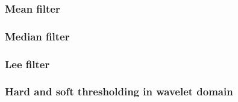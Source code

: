 \subsubsection{Mean filter}



\subsubsection{Median filter}



\subsubsection{Lee filter}



\subsubsection{Hard and soft thresholding in wavelet domain}

